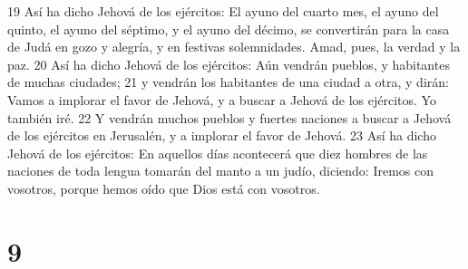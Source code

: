 19 Así ha dicho Jehová de los ejércitos: El ayuno del cuarto mes, el ayuno del quinto, el ayuno del séptimo, y el ayuno del décimo, se convertirán para la casa de Judá en gozo y alegría, y en festivas solemnidades. Amad, pues, la verdad y la paz.
20 Así ha dicho Jehová de los ejércitos: Aún vendrán pueblos, y habitantes de muchas ciudades;
21 y vendrán los habitantes de una ciudad a otra, y dirán: Vamos a implorar el favor de Jehová, y a buscar a Jehová de los ejércitos. Yo también iré.
22 Y vendrán muchos pueblos y fuertes naciones a buscar a Jehová de los ejércitos en Jerusalén, y a implorar el favor de Jehová.
23 Así ha dicho Jehová de los ejércitos: En aquellos días acontecerá que diez hombres de las naciones de toda lengua tomarán del manto a un judío, diciendo: Iremos con vosotros, porque hemos oído que Dios está con vosotros.

\chapter{9}

